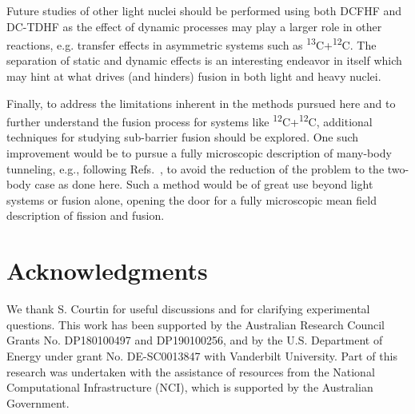 Future studies of other light nuclei should be performed using both DCFHF and DC-TDHF as the effect of dynamic processes may play a larger role in other reactions, e.g. transfer effects in asymmetric systems such as \textsuperscript{13}C+\textsuperscript{12}C. 
The separation of static and dynamic effects is an interesting endeavor in itself which may hint at what drives (and hinders) fusion in both light and heavy nuclei.

Finally, to address the limitations inherent in the methods pursued here and to further understand the fusion process for systems like \textsuperscript{12}C+\textsuperscript{12}C, additional techniques for studying sub-barrier fusion should be explored.
One such improvement would be to pursue a fully microscopic description of many-body tunneling, e.g., following Refs.~\protect\cite{levit1980c,reinhardt1980}, 
 to avoid the reduction of the problem to the two-body case as done here.
Such a method would be of great use beyond light systems or fusion alone, opening the door for a fully microscopic mean field description of fission and fusion.



\section*{Acknowledgments}
We thank S. Courtin for useful discussions and for clarifying experimental questions. 
This work has been supported by the
Australian Research Council Grants No. DP180100497 and DP190100256,
and by the U.S. Department of Energy under grant No.
DE-SC0013847 with Vanderbilt University.
Part of this research was undertaken with the assistance of resources
from the National Computational Infrastructure (NCI), which is supported by the Australian Government.

\clearpage
